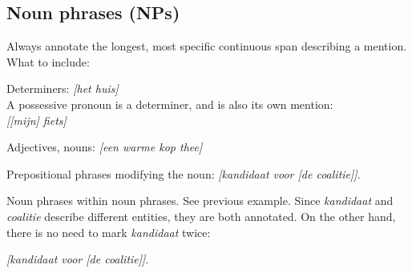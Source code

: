 \subsection{Noun phrases (NPs)}
Always annotate the longest, most specific
continuous span describing a mention. What to include:
\begin{itemize*}
    \item Determiners: \emph{[het huis]} \\
        A possessive pronoun is a determiner,
        and is also its own mention:\\
            \emph{[[mijn] fiets]}
    \item Adjectives, nouns: \emph{[een warme kop thee]}
    \item Prepositional phrases modifying the noun:
        \emph{[kandidaat voor [de coalitie]]}.
    \item Noun phrases within noun phrases. See previous example.
        Since \emph{kandidaat} and \emph{coalitie} describe different
        entities, they are both annotated. On the other hand,
        there is no need to mark \emph{kandidaat} twice:

        \emph{[\n{[}kandidaat\n{]} voor [de coalitie]]}.

\end{itemize*}

